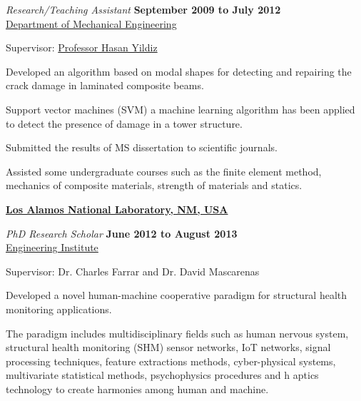 \documentclass[10pt]{article}
\newcommand{\halfblankline}{\quad\vspace{-0.5\baselineskip}\pagebreak[3]}
\begin{document}
 \item[] \textit{Research/Teaching Assistant}%
            \hfill \textbf{September 2009 to July 2012}\\
            \href{https://me.ege.edu.tr/eng-/Homepage.html}{Department of Mechanical Engineering}
         \item Supervisor: \href{https://unisis.ege.edu.tr/researcher=hasan.yildiz}{Professor Hasan Yildiz}                       
           \begin{innerlist}
                 
		\item Developed an algorithm based on modal shapes
			for detecting and repairing the crack damage in laminated
			composite beams.
		\item Support vector machines (SVM) a machine learning algorithm
		 has been applied to detect the presence of damage in a tower structure.
		\item Submitted the results of MS dissertation to scientific journals.
		\item Assisted some undergraduate courses such as the finite element method,
		mechanics of composite materials, strength of materials and statics.
            
 		\end{innerlist}
 		
  \halfblankline
 		
   \href{https://www.lanl.gov}{\textbf{Los Alamos National Laboratory, NM, USA}}
    \item[] \textit{PhD Research Scholar} \hfill \textbf{June 2012 to August 2013}\\
    \href{https://www.lanl.gov/projects/national-security-education-center/engineering/}{Engineering
    Institute}

    \item Supervisor: Dr. Charles Farrar and Dr. David Mascarenas
    
        \begin{innerlist}
                 
		\item Developed a novel human-machine cooperative paradigm
			for structural health monitoring applications. 
		\item The paradigm includes multidisciplinary fields such as human nervous system, 
			structural health monitoring (SHM) sensor networks, IoT networks, 
			signal processing techniques,  feature extractions methods, cyber-physical systems,
			 multivariate statistical methods, psychophysics procedures and h
			 aptics technology to create harmonies among human and machine.  
            
 		\end{innerlist}
\end{document}
